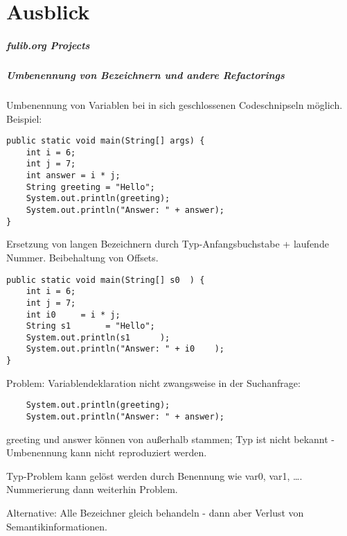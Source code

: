 \chapter{Ausblick}\label{ch:future-work}


\paragraph{fulib.org Projects}\label{par:future-projects}

\paragraph{Umbenennung von Bezeichnern und andere Refactorings}\label{par:renaming-and-refactoring}


Umbenennung von Variablen bei in sich geschlossenen Codeschnipseln möglich.
Beispiel:

\begin{verbatim}
public static void main(String[] args) {
    int i = 6;
    int j = 7;
    int answer = i * j;
    String greeting = "Hello";
    System.out.println(greeting);
    System.out.println("Answer: " + answer);
}
\end{verbatim}

Ersetzung von langen Bezeichnern durch Typ-Anfangsbuchstabe + laufende Nummer.
Beibehaltung von Offsets.

\begin{verbatim}
public static void main(String[] s0  ) {
    int i = 6;
    int j = 7;
    int i0     = i * j;
    String s1       = "Hello";
    System.out.println(s1      );
    System.out.println("Answer: " + i0    );
}
\end{verbatim}

Problem: Variablendeklaration nicht zwangsweise in der Suchanfrage:

\begin{verbatim}
    System.out.println(greeting);
    System.out.println("Answer: " + answer);
\end{verbatim}

greeting und answer können von außerhalb stammen;
Typ ist nicht bekannt -
Umbenennung kann nicht reproduziert werden.

Typ-Problem kann gelöst werden durch Benennung wie var0, var1, \ldots.
Nummerierung dann weiterhin Problem.

Alternative: Alle Bezeichner gleich behandeln - dann aber Verlust von Semantikinformationen.
